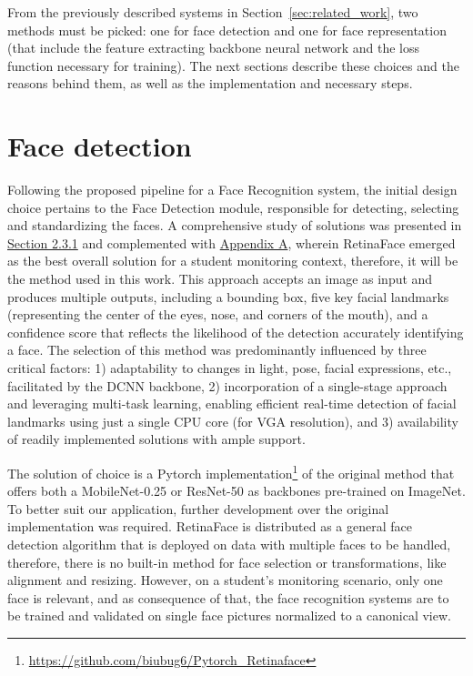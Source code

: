 \documentclass[class=report, crop=false, a4paper, 12pt]{standalone}
\begin{document}
\par From the previously described systems in Section~\ref{sec:related_work}, two methods must be picked: one for face detection and one for face representation (that include the feature extracting backbone neural network and the loss function necessary for training). The next sections describe these choices and the reasons behind them, as well as the implementation and necessary steps.

\section{Face detection}
\par Following the proposed pipeline for a Face Recognition system, the initial design choice pertains to the Face Detection module, responsible for detecting, selecting and standardizing the faces. A comprehensive study of solutions was presented in \hyperref[sec:face_detect]{Section 2.3.1} and complemented with \hyperref[appendix:face_detection_appendix]{Appendix A}, wherein RetinaFace emerged as the best overall solution for a student monitoring context, therefore, it will be the method used in this work. This approach accepts an image as input and produces multiple outputs, including a bounding box, five key facial landmarks (representing the center of the eyes, nose, and corners of the mouth), and a confidence score that reflects the likelihood of the detection accurately identifying a face. The selection of this method was predominantly influenced by three critical factors: 1) adaptability to changes in light, pose, facial expressions, etc., facilitated by the DCNN backbone, 2) incorporation of a single-stage approach and leveraging multi-task learning, enabling efficient real-time detection of facial landmarks using just a single CPU core (for VGA resolution), and 3) availability of readily implemented solutions with ample support.

\par The solution of choice is a Pytorch implementation\footnote{\url{https://github.com/biubug6/Pytorch_Retinaface}} of the original method that offers both a MobileNet-0.25 or ResNet-50 as backbones pre-trained on ImageNet. To better suit our application, further development over the original implementation was required. RetinaFace is distributed as a general face detection algorithm that is deployed on data with multiple faces to be handled, therefore, there is no built-in method for face selection or transformations, like alignment and resizing. However, on a student's monitoring scenario, only one face is relevant, and as consequence of that, the face recognition systems are to be trained and validated on single face pictures normalized to a canonical view.
\end{document}
